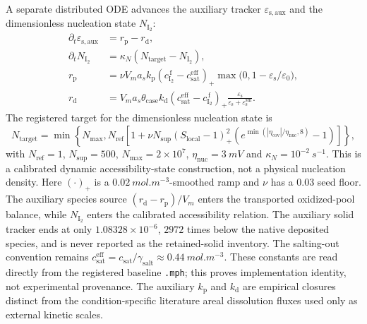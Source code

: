 \documentclass[11pt]{article}
\newcommand{\epss}{\varepsilon_{\mathrm{s}}}
\newcommand{\csat}{c_{\mathrm{sat}}}
\newcommand{\cf}{c_{\mathrm{I_2}}^{\,\mathrm{f}}}
\begin{document}
A separate distributed ODE advances the auxiliary tracker $\varepsilon_{\mathrm{s,aux}}$ and the dimensionless
nucleation state $N_{\mathrm{I_2}}$:
\begin{align*}
\partial_t\varepsilon_{\mathrm{s,aux}}&=r_{\mathrm p}-r_{\mathrm d},\\
\partial_tN_{\mathrm{I_2}}&=\kappa_N(N_{\mathrm{target}}-N_{\mathrm{I_2}}),\\
r_{\mathrm p}&=\nu V_m a_s k_{\mathrm p}(\cf-\csat^{\mathrm{eff}})_{+}
\max\!\big(0,1-\epss/\varepsilon_0\big),\\
r_{\mathrm d}&=V_m a_s\theta_{\mathrm{case}} k_{\mathrm d}
(\csat^{\mathrm{eff}}-\cf)_{+}\frac{\epss}{\epss+\epss^{\mathrm{sm}}}.
\end{align*}
The registered target for the dimensionless nucleation state is
\begin{equation*}
N_{\mathrm{target}}=\min\!\left\{N_{\max},N_{\mathrm{ref}}\left[1+
\nu N_{\mathrm{sup}}(S_{\mathrm{local}}-1)_+^2
\left(e^{\min(|\eta_{\mathrm{cov}}|/\eta_{\mathrm{nuc}},8)}-1\right)\right]\right\},
\end{equation*}
with $N_{\mathrm{ref}}=1$, $N_{\mathrm{sup}}=500$, $N_{\max}=2\times10^7$,
$\eta_{\mathrm{nuc}}=\SI{3}{mV}$ and $\kappa_N=10^{-2}~\si{s^{-1}}$. This is a calibrated dynamic
accessibility-state construction, not a physical nucleation density.
Here $(\cdot)_+$ is a $\SI{0.02}{mol.m^{-3}}$-smoothed ramp and $\nu$ has a $0.03$ seed floor.
The auxiliary species source $(r_{\mathrm d}-r_{\mathrm p})/V_m$ enters the transported oxidized-pool
balance, while $N_{\mathrm{I_2}}$ enters the calibrated accessibility relation. The auxiliary solid tracker
ends at only $1.08328\times10^{-6}$, $2972$ times below the native deposited species, and is never reported as
the retained-solid inventory. The salting-out convention remains
$\csat^{\mathrm{eff}}=\csat/\gamma_{\mathrm{salt}}\approx\SI{0.44}{mol.m^{-3}}$. These constants are read
directly from the registered baseline \texttt{.mph}; this proves implementation identity, not experimental
provenance. The auxiliary $k_{\mathrm p}$ and $k_{\mathrm d}$ are empirical closures distinct from the
condition-specific literature areal dissolution fluxes used only as external kinetic scales.
\end{document}
